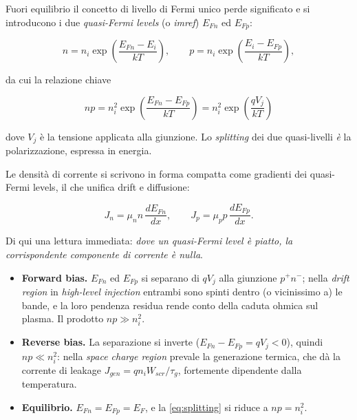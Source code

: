 \documentclass[11pt,a4paper]{article}
\begin{document}
Fuori equilibrio il concetto di livello di Fermi unico perde significato e si
introducono i due \emph{quasi-Fermi levels} (o \emph{imref}) $E_{Fn}$ ed
$E_{Fp}$:

\begin{equation}
n = n_i \exp\!\left(\frac{E_{Fn} - E_i}{kT}\right),
\qquad
p = n_i \exp\!\left(\frac{E_i - E_{Fp}}{kT}\right),
\end{equation}

da cui la relazione chiave

\begin{equation}
\boxed{\; np = n_i^{2} \exp\!\left(\frac{E_{Fn} - E_{Fp}}{kT}\right)
= n_i^{2} \exp\!\left(\frac{qV_{j}}{kT}\right) \;}
\label{eq:splitting}
\end{equation}

dove $V_j$ è la tensione applicata alla giunzione. Lo \emph{splitting} dei due
quasi-livelli \emph{è} la polarizzazione, espressa in energia.

Le densità di corrente si scrivono in forma compatta come gradienti dei
quasi-Fermi levels, il che unifica drift e diffusione:

\begin{equation}
J_n = \mu_n n \, \frac{d E_{Fn}}{dx},
\qquad
J_p = \mu_p p \, \frac{d E_{Fp}}{dx} .
\end{equation}

Di qui una lettura immediata: \emph{dove un quasi-Fermi level è piatto, la
corrispondente componente di corrente è nulla}.

\begin{itemize}
\item \textbf{Forward bias.} $E_{Fn}$ ed $E_{Fp}$ si separano di $qV_j$ alla
giunzione $p^{+}n^{-}$; nella \emph{drift region} in \emph{high-level injection}
entrambi sono spinti dentro (o vicinissimo a) le bande, e la loro pendenza
residua rende conto della caduta ohmica sul plasma. Il prodotto $np \gg n_i^2$.
\item \textbf{Reverse bias.} La separazione si inverte
($E_{Fn} - E_{Fp} = qV_j < 0$), quindi $np \ll n_i^{2}$: nella \emph{space
charge region} prevale la generazione termica, che dà la corrente di leakage
$J_{gen} = q n_i W_{scr} / \tau_g$, fortemente dipendente dalla temperatura.
\item \textbf{Equilibrio.} $E_{Fn} = E_{Fp} = E_F$, e la \eqref{eq:splitting} si
riduce a $np = n_i^2$.
\end{itemize}
\end{document}
